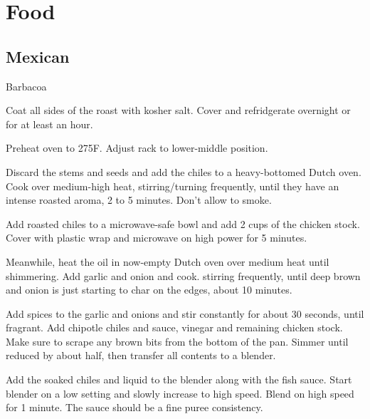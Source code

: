 \documentclass[]{article}
\begin{document}
\tableofcontents
\newpage


\section{Food}

\subsection{Mexican}

\begin{recipe}{Barbacoa}{}{}
	
	
	Coat all sides of the roast with kosher salt. Cover and refridgerate overnight or for
	at least an hour.
	
	\newstep
	Preheat oven to 275\0F. Adjust rack to lower-middle position.
	
	Discard the stems and seeds and add the chiles to a heavy-bottomed Dutch oven.
	Cook over medium-high heat, stirring/turning frequently, until they have an intense
	roasted aroma, 2 to 5 minutes. Don't allow to smoke.

	Add roasted chiles to a microwave-safe bowl and add 2 cups of the chicken stock.
	Cover with plastic wrap and microwave on high power for 5 minutes.

	Meanwhile, heat the oil in now-empty Dutch oven over medium heat until 
	shimmering. Add garlic and onion and cook. stirring frequently, until deep brown 
	and onion is just starting to char on the edges, about 10 minutes.

	Add spices to the garlic and onions and stir constantly for about 30 seconds, until fragrant.
	Add chipotle chiles and sauce, vinegar and remaining chicken stock. Make sure to scrape any brown
	bits from the bottom of the pan. Simmer until reduced by about half, then transfer all contents to
	a blender.

	Add the soaked chiles and liquid to the blender along with the fish sauce. Start blender on a low
	setting and slowly increase to high speed. Blend on high speed for 1 minute. The sauce should be a fine
	puree consistency.


\end{recipe}
\end{document}
